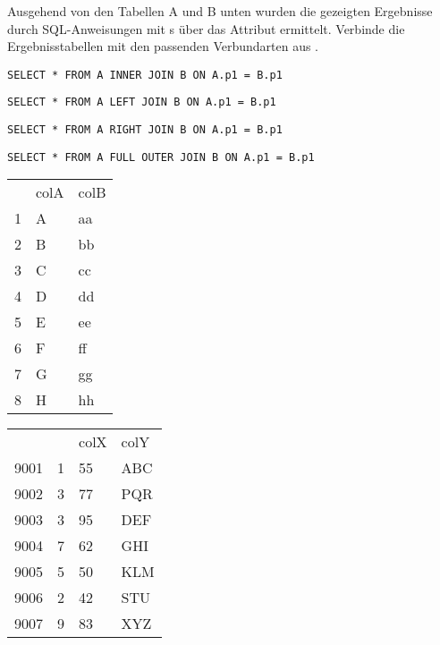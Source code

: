 \documentclass[10pt, a4paper, ngerman]{arbeitsblatt}
\begin{document}
\begin{aufgabe}
Ausgehend von den Tabellen A und B unten wurden die gezeigten Ergebnisse durch SQL-Anweisungen mit s über das Attribut  ermittelt. Verbinde die Ergebnisstabellen mit den passenden Verbundarten aus .

\begin{enuma}
	\item \texttt{SELECT * FROM A INNER JOIN B ON A.p1 = B.p1}
	\item \texttt{SELECT * FROM A LEFT JOIN B ON A.p1 = B.p1}
	\item \texttt{SELECT * FROM A RIGHT JOIN B ON A.p1 = B.p1}
	\item \texttt{SELECT * FROM A FULL OUTER JOIN B ON A.p1 = B.p1}
\end{enuma}

\begin{tabularx}{4cm}{*{3}{X}}
	\rowcolor{ab.tabelle.kopf.hg!90!black}
	\multicolumn{3}{l}{\code{A}}       \\
	\hline\rowcolor{ab.tabelle.kopf.hg}
	\primarykey{p1} & colA & colB      \\
	\hline\hline
	1 & A & aa \\\hline
	2 & B & bb \\\hline
	3 & C & cc \\\hline
	4 & D & dd \\\hline
	5 & E & ee \\\hline
	6 & F & ff \\\hline
	7 & G & gg \\\hline
	8 & H & hh \\\hline
\end{tabularx}

\begin{tabularx}{4cm}{*{4}{X}}
	\rowcolor{ab.tabelle.kopf.hg!90!black}
	\multicolumn{4}{l}{\code{B}}       \\
	\hline\rowcolor{ab.tabelle.kopf.hg}
	\primarykey{p2} & \foreignkey{p1} & colX & colY      \\
	\hline\hline
	9001 & 1 & 55 & ABC \\\hline
	9002 & 3 & 77 & PQR \\\hline
	9003 & 3 & 95 & DEF \\\hline
	9004 & 7 & 62 & GHI \\\hline
	9005 & 5 & 50 & KLM \\\hline
	9006 & 2 & 42 & STU \\\hline
	9007 & 9 & 83 & XYZ \\\hline
\end{tabularx}


\end{aufgabe}
\end{document}
